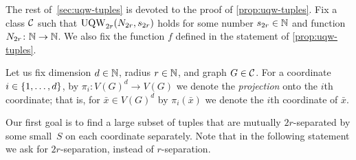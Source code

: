 The rest of~\cref{sec:uqw-tuples} is devoted to the proof of \cref{prop:uqw-tuples}.
Fix a class $\cal C$
such that $\uqw_{2r}(N_{2r},s_{2r})$ holds for some number $s_{2r}\in \N$ and  function $N_{2r}\from \N\to \N$.
We also fix the function $f$ defined in the statement of \cref{prop:uqw-tuples}.


\medskip

	Let us fix dimension $d\in \N$, radius $r\in \N$, and graph $G\in \cal C$.
        For a coordinate $i\in\set{1,\ldots,d}$, by $\pi_i\colon V(G)^d\to V(G)$ we denote the {\em{projection}} onto the $i$th coordinate; that is,
        for $\bar{x}\in V(G)^d$ by $\pi_i(\bar{x})$ we denote the $i$th coordinate of $\bar{x}$.
        
	
	Our first goal is to find a large subset of tuples that are mutually $2r$-separated by some small~$S$ on each coordinate separately.
	Note that in the following statement we ask for $2r$-separation, instead of $r$-separation.

